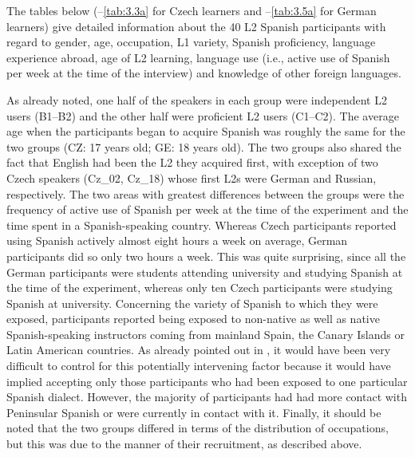 The tables below (--\ref{tab:3.3a} for Czech learners and --\ref{tab:3.5a} for German learners) give detailed information about the 40 L2 Spanish participants with regard to gender, age, occupation, L1 variety, Spanish proficiency, language experience abroad, age of L2 learning, language use (i.e., active use of Spanish per week at the time of the interview) and knowledge of other foreign languages.

As already noted, one half of the speakers in each group were independent L2 users (B1--B2) and the other half were proficient L2 users (C1--C2). The average age when the participants began to acquire Spanish was roughly the same for the two groups (CZ: 17 years old; GE: 18 years old). The two groups also shared the fact that English had been the L2 they acquired first, with exception of two Czech speakers (Cz\_02, Cz\_18) whose first L2s were German and Russian, respectively. The two areas with greatest differences between the groups were the frequency of active use of Spanish per week at the time of the experiment and the time spent in a Spanish-speaking country. Whereas Czech participants reported using Spanish actively almost eight hours a week on average, German participants did so only two hours a week. This was quite surprising, since all the German participants were students attending university and studying Spanish at the time of the experiment, whereas only ten Czech participants were studying Spanish at university. Concerning the variety of Spanish to which they were exposed, participants reported being exposed to non-native as well as native Spanish-speaking instructors coming from mainland Spain, the Canary Islands or Latin American countries. As already pointed out in , it would have been very difficult to control for this potentially intervening factor because it would have implied accepting only those participants who had been exposed to one particular Spanish dialect. However, the majority of participants had had more contact with Peninsular Spanish or were currently in contact with it. Finally, it should be noted that the two groups differed in terms of the distribution of occupations, but this was due to the manner of their recruitment, as described above.\pagebreak


